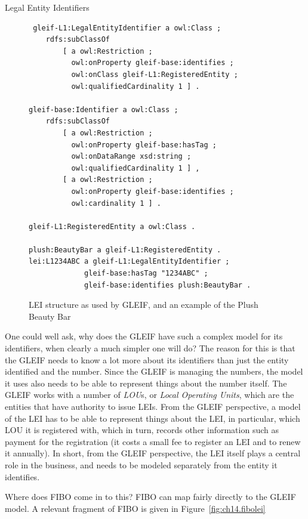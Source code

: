 \begin{challenge}{Legal Entity Identifiers}
\begin{figure}
 \begin{lstlisting}
 gleif-L1:LegalEntityIdentifier a owl:Class ;
	rdfs:subClassOf
		[ a owl:Restriction ;
 		  owl:onProperty gleif-base:identifies ;
 		  owl:onClass gleif-L1:RegisteredEntity ;
 		  owl:qualifiedCardinality 1 ] .

gleif-base:Identifier a owl:Class ;
	rdfs:subClassOf
		[ a owl:Restriction ;
 		  owl:onProperty gleif-base:hasTag ;
 		  owl:onDataRange xsd:string ;
 		  owl:qualifiedCardinality 1 ] ,
		[ a owl:Restriction ;
 		  owl:onProperty gleif-base:identifies ;
 		  owl:cardinality 1 ] .

gleif-L1:RegisteredEntity a owl:Class .

plush:BeautyBar a gleif-L1:RegisteredEntity .
lei:L1234ABC a gleif-L1:LegalEntityIdentifier ;
             gleif-base:hasTag "1234ABC" ;
             gleif-base:identifies plush:BeautyBar . 
 \end{lstlisting}
    \caption{LEI structure as used by GLEIF, and an example of the Plush Beauty Bar}
    \label{fig:ch14.gleifLEI}
\end{figure}

One could well ask, why does the GLEIF have such a complex model 
for its identifiers, when clearly a much simpler one will do? 
The reason for this is that the GLEIF needs to know a lot more 
about its identifiers than just the entity identified and the number.
Since the GLEIF is managing the numbers, the model it uses also needs to be able to represent 
things about the number itself.  The GLEIF works with a number of
\emph{LOU}s, or \emph{Local Operating Units}, which are the entities that
have authority to issue LEIs.  From the GLEIF perspective, a model 
of the LEI has to be able to represent things about the LEI, in particular,  
which LOU it is registered with, which in turn, records other information such 
as payment for the registration (it costs a small fee to register an LEI and to 
renew it annually).  In short, 
from the GLEIF
perspective, the LEI itself plays a central role in the business, and needs to be
modeled separately from the entity it identifies. 
\end{challenge}


Where does FIBO come in to this?    FIBO can map fairly directly 
to the GLEIF model.  A relevant fragment of FIBO is given in 
Figure~\ref{fig:ch14.fibolei}


